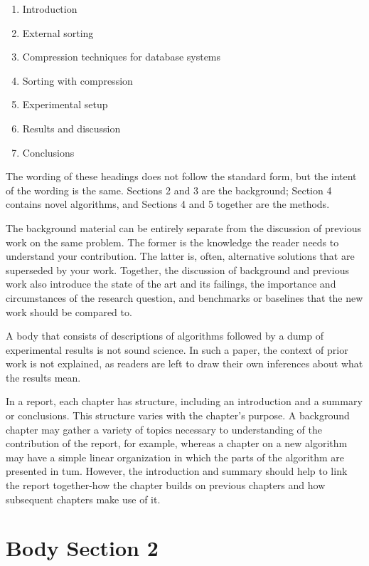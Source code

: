 \documentclass[a4paper,oneside,bibliography=totoc]{scrartcl}
\begin{document}
{  \begin{enumerate}
  \item Introduction
  \item External sorting
  \item Compression techniques for database systems
  \item Sorting with compression
  \item Experimental setup
  \item Results and discussion
  \item Conclusions
  \end{enumerate}

  The wording of these headings does not follow the standard form, but the
  intent of the wording is the same. Sections 2 and 3 are the background;
  Section 4 contains novel algorithms, and Sections 4 and 5 together are the
  methods.

  The background material can be entirely separate from the discussion of
  previous work on the same problem. The former is the knowledge the reader
  needs to understand your contribution. The latter is, often, alternative
  solutions that are superseded by your work. Together, the discussion of
  background and previous work also introduce the state of the art and its
  failings, the importance and circumstances of the research question, and
  benchmarks or baselines that the new work should be compared to.

  A body that consists of descriptions of algorithms followed by a dump of
  experimental results is not sound science. In such a paper, the context of
  prior work is not explained, as readers are left to draw their own inferences
  about what the results mean.

  In a report, each chapter has structure, including an introduction and a
  summary or conclusions. This structure varies with the chapter's purpose. A
  background chapter may gather a variety of topics necessary to understanding
  of the contribution of the report, for example, whereas a chapter on a new
  algorithm may have a simple linear organization in which the parts of the
  algorithm are presented in tum. However, the introduction and summary should
  help to link the report together-how the chapter builds on previous chapters
  and how subsequent chapters make use of it. }

\section{Body Section 2}
\end{document}
